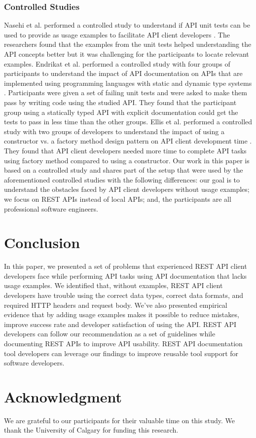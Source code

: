 \documentclass[conference]{IEEEtran}
\begin{document}
\subsubsection{Controlled Studies}
Nasehi et al. performed a controlled study to understand if API unit tests can be used to provide as usage examples to facilitate API client developers \cite{5609553}. The researchers found that the examples from the unit tests helped understanding the API concepts better but it was challenging for the participants to locate relevant examples. Endrikat et al. performed a controlled study with four groups of participants to understand the impact of API documentation on APIs that are implemented using programming languages with static and dynamic type systems \cite{Endrikat:2014:ADS:2568225.2568299}. Participants were given a set of failing unit tests and were asked to make them pass by writing code using the studied API. They found that the participant group using a statically typed API with explicit documentation could get the tests to pass in less time than the other groups. Ellis et al. performed a controlled study with two groups of developers to understand the impact of using a constructor vs. a factory method design pattern on API client development time \cite{Ellis:2007:FPA:1248820.1248863}. They found that API client developers needed more time to complete API tasks using factory method compared to using a constructor. Our work in this paper is based on a controlled study and shares part of the setup that were used by the aforementioned controlled studies with the following differences: our goal is to understand the obstacles faced by API client developers without usage examples;  we focus on REST APIs instead of local APIs; and, the participants are all professional software engineers.

\section{Conclusion}
In this paper, we presented a set of problems that experienced REST API client developers face while performing API tasks using API documentation that lacks usage examples. We identified that, without examples, REST API client developers have trouble using the correct data types, correct data formats, and required HTTP headers and request body. We've also presented empirical evidence that by adding usage examples makes it possible to reduce mistakes, improve success rate and developer satisfaction of using the API. REST API developers can follow our recommendation as a set of guidelines while documenting REST APIs to improve API usability. REST API documentation tool developers can leverage our findings to improve reusable tool support for software developers.

\section*{Acknowledgment}
We are grateful to our participants for their valuable time on this study. We thank the University of Calgary for funding this research.



\end{document}
